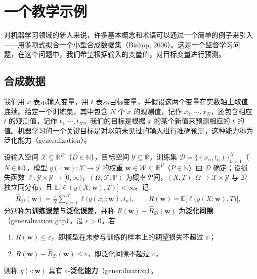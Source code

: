 \documentclass[../../main.tex]{subfiles}
\begin{document}
\section{一个教学示例}\label{section:ch01-一个教学示例}

对机器学习领域的新人来说，许多基本概念和术语可以通过一个简单的例子来引入——用多项式拟合一个小型合成数据集（Bishop, 2006）。这是一个监督学习问题，在这个问题中，我们希望根据输入的变量值，对目标变量进行预测。

\subsection{合成数据}\label{subsection:ch01-合成数据}

我们用 $x$ 表示输入变量，用 $t$ 表示目标变量，并假设这两个变量在实数轴上取值连续。给定一个训练集，其中包含 $N$ 个 $x$ 的观测值，记作 $x_1,\cdots,x_N$，还包含相应 $t$ 的观测值，记作 $t_1,\cdots,t_N$。我们的目标是根据 $x$ 的某个新值来预测相应的 $t$ 的值。机器学习的一个关键目标是对以前未见过的输入进行准确预测，这种能力称为泛化能力（generalization）。

\begin{definition}[泛化能力]\label{definition:ch01-泛化能力}
设输入空间 $\mathcal{X}\subseteq\mathbb{R}^{D}$（$D\in\mathbb{N}$），目标空间 $\mathcal{Y}\subseteq\mathbb{R}$，训练集 $\mathcal{D}=\{(x_n,t_n)\}_{n=1}^{N}$（$N\in\mathbb{N}$），模型 $y(\cdot;\mathbf{w}):\mathcal{X}\to\mathcal{Y}$ 的权重 $\mathbf{w}\in\mathcal{W}\subseteq\mathbb{R}^{P}$（$P\in\mathbb{N}$）由 $\mathcal{D}$ 确定；设损失函数 $\ell:\mathcal{Y}\times\mathcal{Y}\to[0,\infty)$，$(\Omega,\mathcal{F},\mathbb{P})$ 为概率空间，$(X,T):\Omega\to\mathcal{X}\times\mathcal{Y}$ 与 $\mathcal{D}$ 独立同分布，且 $\mathbb{E}\bigl[\ell(y(X;\mathbf{w}),T)\bigr]<\infty$。记
\begin{align*}
  \widehat{R}_{\mathcal{D}}(\mathbf{w})=\frac{1}{N}\sum_{n=1}^{N}\ell\bigl(y(x_n;\mathbf{w}),t_n\bigr),
  \qquad
  R(\mathbf{w})=\mathbb{E}\bigl[\ell\bigl(y(X;\mathbf{w}),T\bigr)\bigr],
\end{align*}
分别称为\textbf{训练误差}与\textbf{泛化误差}，并称 $R(\mathbf{w})-\widehat{R}_{\mathcal{D}}(\mathbf{w})$ 为\textbf{泛化间隙}（generalization gap）。设 $\varepsilon>0$。若
\begin{enumerate}
  \item $R(\mathbf{w})\leqslant\varepsilon$，即模型在未参与训练的样本上的期望损失不超过 $\varepsilon$；
  \item $R(\mathbf{w})-\widehat{R}_{\mathcal{D}}(\mathbf{w})\leqslant\varepsilon$，即泛化间隙不超过 $\varepsilon$，
\end{enumerate}
则称 $y(\cdot;\mathbf{w})$ 具有 $\varepsilon$-\textbf{泛化能力}（generalization）。
\end{definition}
\end{document}
